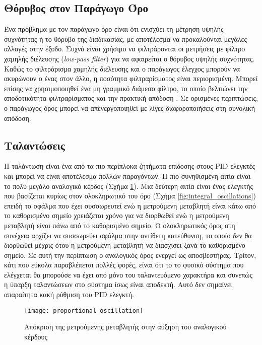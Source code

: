 \subsection{Θόρυβος στον Παράγωγο Όρο}

Ένα πρόβλημα με τον παράγωγο όρο είναι ότι ενισχύει τη μέτρηση υψηλής συχνότητας ή το θόρυβο της διαδικασίας, με αποτέλεσμα να προκαλούνται μεγάλες αλλαγές στην έξοδο. Συχνά είναι χρήσιμο να φιλτράρονται οι μετρήσεις με φίλτρο χαμηλής διέλευσης (\emph{low-pass filter}) για να αφαιρείται ο θόρυβος υψηλής συχνότητας. Καθώς το φιλτράρισμα χαμηλής διέλευσης και ο παράγωγος έλεγχος μπορούν να ακυρώνουν ο ένας στον άλλο, η ποσότητα φιλτραρίσματος είναι περιορισμένη. Μπορεί επίσης να χρησιμοποιηθεί ένα μη γραμμικό διάμεσο φίλτρο, το οποίο βελτιώνει την αποδοτικότητα φιλτραρίσματος και την πρακτική απόδοση \cite{chong}. Σε ορισμένες περιπτώσεις, ο παράγωγος όρος μπορεί να απενεργοποιηθεί με λίγες διαφοροποιήσεις στη συνολική απόδοση.

\subsection{Ταλαντώσεις}

Η ταλάντωση είναι ένα από τα πιο περίπλοκα ζητήματα επίδοσης στους PID ελεγκτές και μπορεί να είναι αποτέλεσμα πολλών παραγόντων. Η πιο συνηθισμένη αιτία είναι το πολύ μεγάλο αναλογικό κέρδος (Σχήμα \ref{fig:proportional_oscillation}). Μια δεύτερη αιτία είναι ένας ελεγκτής που βασίζεται κυρίως στον ολοκληρωτικό του όρο (Σχήμα \ref{fig:integral_oscillations}) επειδή το σφάλμα που έχει συσσωρευτεί ενώ η μετρούμενη μεταβλητή είναι κάτω από το καθορισμένο σημείο χρειάζεται χρόνο για να διορθωθεί ενώ η μετρούμενη μεταβλητή είναι πάνω από το καθορισμένο σημείο. Ο ολοκληρωτικός όρος στη συνέχεια αρχίζει να συσσωρεύει σφάλμα στην αντίθετη κατεύθυνση, το οποίο δεν θα διορθωθεί μέχρις ότου η μετρούμενη μεταβλητή να διασχίσει ξανά το καθορισμένο σημείο. Σε αυτή την περίπτωση ο αναλογικός όρος ενεργεί ως αποσβεστήρας. Τρίτον, κάτι που εύκολα παραβλέπεται πολλές φορές, είναι ότι το το φυσικό σύστημα που ελέγχεται θα μπορούσε να έχει από μόνο του ταλαντευόμενο χαρακτήρα και συνεπώς η ύπαρξη ταλαντώσεων στο σύστημα ίσως είναι αποδεκτή. Αυτό δεν σημαίνει απαραίτητα κακή ρύθμιση του PID ελεγκτή.

\begin{figure}[h]
  \centering
  \texttt{[image: proportional\_oscillation]}
  \caption{Απόκριση της μετρούμενης μεταβλητής στην αύξηση του αναλογικού κέρδους}
  \label{fig:proportional_oscillation}
\end{figure}

